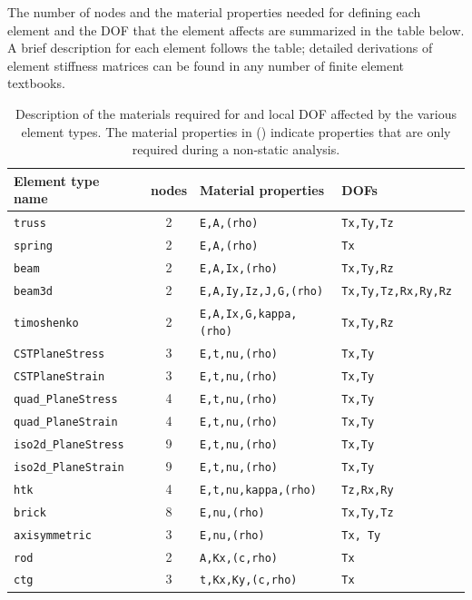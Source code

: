 The number of 
nodes and the material properties needed for defining each element and the DOF 
that the element affects are summarized in the table below.  A brief 
description for each element follows the table; detailed derivations of element 
stiffness matrices can be found in any number of finite element textbooks.
\begin{table}
\begin{center}
\small{
 \begin{tabular}{|l|c|l|l|}
  \hline
  Element type name	& nodes	& Material properties 	& DOFs	\\
  \hline\hline
  \tt truss		 & 2	& \tt E,A,(rho)		& \tt Tx,Ty,Tz \\
  \tt spring             & 2    & \tt E,A,(rho)         & \tt Tx \\
  \tt beam		 & 2	& \tt E,A,Ix,(rho)	& \tt Tx,Ty,Rz \\
  \tt beam3d		 & 2	& \tt E,A,Iy,Iz,J,G,(rho) & \tt Tx,Ty,Tz,Rx,Ry,Rz \\
  \tt timoshenko         & 2    & \tt E,A,Ix,G,kappa,(rho)& \tt Tx,Ty,Rz \\
  \tt CSTPlaneStress	 & 3	& \tt E,t,nu,(rho)	& \tt Tx,Ty \\
  \tt CSTPlaneStrain	 & 3	& \tt E,t,nu,(rho)	& \tt Tx,Ty \\
  \tt quad\_PlaneStress	 & 4	& \tt E,t,nu,(rho)	& \tt Tx,Ty \\
  \tt quad\_PlaneStrain	 & 4	& \tt E,t,nu,(rho)	& \tt Tx,Ty \\
  \tt iso2d\_PlaneStress & 9	& \tt E,t,nu,(rho)	& \tt Tx,Ty \\
  \tt iso2d\_PlaneStrain & 9	& \tt E,t,nu,(rho)	& \tt Tx,Ty \\
  \tt htk                & 4    & \tt E,t,nu,kappa,(rho) & \tt Tz,Rx,Ry \\
  \tt brick              & 8    & \tt E,nu,(rho)	& \tt Tx,Ty,Tz \\
  \tt axisymmetric       & 3    & \tt E,nu,(rho)        & \tt Tx, Ty \\ 
  \tt rod		 & 2 	& \tt A,Kx,(c,rho)	& \tt Tx \\
  \tt ctg		 & 3	& \tt t,Kx,Ky,(c,rho)	& \tt Tx \\
  \hline
 \end{tabular}
}
\end{center}
\caption[Description of the materials required for and local DOF affected
         by the various element types.]
        {Description of the materials required for and local DOF affected
         by the various element types.  The material properties in ()
         indicate properties that are only required during a non-static
         analysis.}
\end{table}

